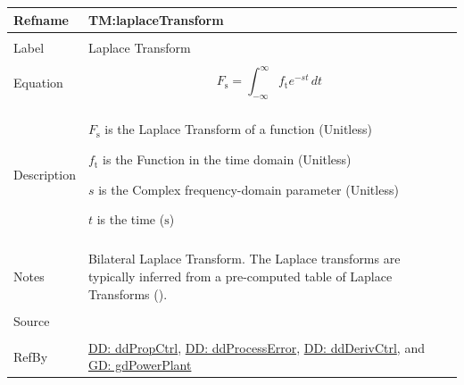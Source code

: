 \documentclass[12pt]{article}
\begin{document}
\vspace{\baselineskip}
\noindent
\begin{minipage}{\textwidth}
\begin{tabular}{>{\raggedright}p{}>{\raggedright\arraybackslash}p{}}
\toprule \textbf{Refname} & \textbf{TM:laplaceTransform}
\label{TM:laplaceTransform}
\\ \midrule \\
Label & Laplace Transform
        
\\ \midrule \\
Equation & \begin{displaymath}
           {F_{\text{s}}}=\int_{-∞}^{∞}{{f_{\text{t}}} e^{-s t}}\,dt
           \end{displaymath}
\\ \midrule \\
Description & \begin{symbDescription}
              \item{${F_{\text{s}}}$ is the Laplace Transform of a function (Unitless)}
              \item{${f_{\text{t}}}$ is the Function in the time domain (Unitless)}
              \item{$s$ is the Complex frequency-domain parameter (Unitless)}
              \item{$t$ is the time (${\text{s}}$)}
              \end{symbDescription}
\\ \midrule \\
Notes & Bilateral Laplace Transform. The Laplace transforms are typically inferred from a pre-computed table of Laplace Transforms (\cite{laplaceWiki}).
        
\\ \midrule \\
Source & \cite{laplaceWiki}
         
\\ \midrule \\
RefBy & \hyperref[DD:ddPropCtrl]{DD: ddPropCtrl}, \hyperref[DD:ddProcessError]{DD: ddProcessError}, \hyperref[DD:ddDerivCtrl]{DD: ddDerivCtrl}, and \hyperref[GD:gdPowerPlant]{GD: gdPowerPlant}
        
\\ \bottomrule
\end{tabular}
\end{minipage}
\vspace{\baselineskip}
\end{document}
